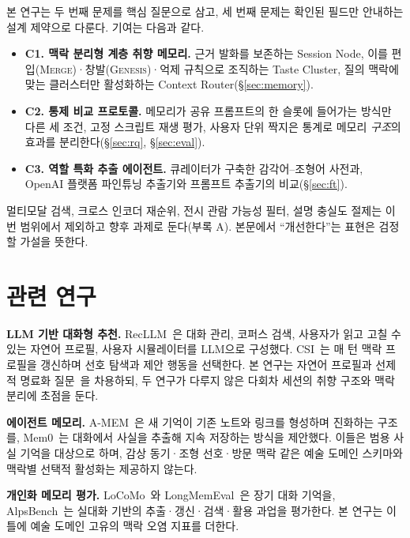 \documentclass[10pt,twocolumn,letterpaper]{article}
\begin{document}
본 연구는 두 번째 문제를 핵심 질문으로 삼고, 세 번째 문제는 확인된 필드만 안내하는 설계 제약으로 다룬다. 기여는 다음과 같다.
\begin{itemize}
\item \textbf{C1. 맥락 분리형 계층 취향 메모리.} 근거 발화를 보존하는 Session Node, 이를 편입(\textsc{Merge})·창발(\textsc{Genesis})·억제 규칙으로 조직하는 Taste Cluster, 질의 맥락에 맞는 클러스터만 활성화하는 Context Router(§\ref{sec:memory}).
\item \textbf{C2. 통제 비교 프로토콜.} 메모리가 공유 프롬프트의 한 슬롯에 들어가는 방식만 다른 세 조건, 고정 스크립트 재생 평가, 사용자 단위 짝지은 통계로 메모리 \emph{구조}의 효과를 분리한다(§\ref{sec:rq}, §\ref{sec:eval}).
\item \textbf{C3. 역할 특화 추출 에이전트.} 큐레이터가 구축한 감각어–조형어 사전과, OpenAI 플랫폼 파인튜닝 추출기와 프롬프트 추출기의 비교(§\ref{sec:ft}).
\end{itemize}
멀티모달 검색, 크로스 인코더 재순위, 전시 관람 가능성 필터, 설명 충실도 절제는 이번 범위에서 제외하고 향후 과제로 둔다(부록 A). 본문에서 ``개선한다''는 표현은 검정할 가설을 뜻한다.

\section{관련 연구}
\label{sec:related}

\textbf{LLM 기반 대화형 추천.} RecLLM~\cite{friedman2023recllm}은 대화 관리, 코퍼스 검색, 사용자가 읽고 고칠 수 있는 자연어 프로필, 사용자 시뮬레이터를 LLM으로 구성했다. CSI~\cite{kim2025csi}는 매 턴 맥락 프로필을 갱신하며 선호 탐색과 제안 행동을 선택한다. 본 연구는 자연어 프로필과 선제적 명료화 질문~\cite{aliannejadi2019asking}을 차용하되, 두 연구가 다루지 않은 다회차 세션의 취향 구조와 맥락 분리에 초점을 둔다.

\textbf{에이전트 메모리.} A-MEM~\cite{xu2025amem}은 새 기억이 기존 노트와 링크를 형성하며 진화하는 구조를, Mem0~\cite{chhikara2025mem0}는 대화에서 사실을 추출해 지속 저장하는 방식을 제안했다. 이들은 범용 사실 기억을 대상으로 하며, 감상 동기·조형 선호·방문 맥락 같은 예술 도메인 스키마와 맥락별 선택적 활성화는 제공하지 않는다.

\textbf{개인화 메모리 평가.} LoCoMo~\cite{maharana2024locomo}와 LongMemEval~\cite{wu2025longmemeval}은 장기 대화 기억을, AlpsBench~\cite{xiao2026alpsbench}는 실대화 기반의 추출·갱신·검색·활용 과업을 평가한다. 본 연구는 이 틀에 예술 도메인 고유의 맥락 오염 지표를 더한다.
\end{document}
